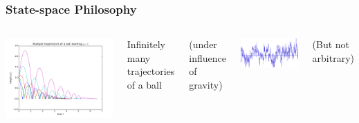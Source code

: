 \documentclass[12pt]{beamer}
\begin{document}
\begin{frame}
\frametitle{State-space Philosophy}

\begin{columns}

\centering
\includegraphics[width=\linewidth]{pic/bouncing_ball_flat}

Infinitely many trajectories of a ball

(under influence of gravity)

\centering
\includegraphics[width=\linewidth]{pic/pink.png}

(But not arbitrary)

\end{columns}


\end{frame}
\end{document}

